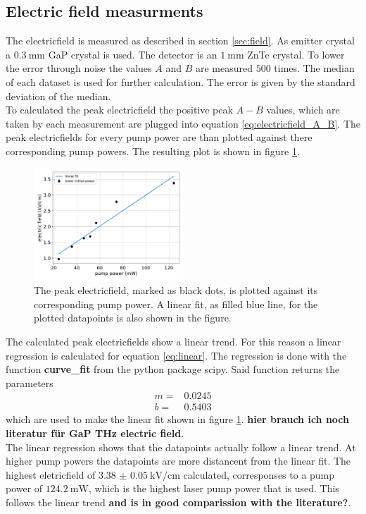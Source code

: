 \subsection{Electric field measurments}
\FloatBarrier
The electricfield is measured as described in section \ref{sec:field}.
As emitter crystal a $\SI{0.3}{\milli\meter}$ GaP crystal is used.
The detector is an $\SI{1}{\milli\meter}$ ZnTe crystal.
To lower the error through noise the values $A$ and $B$ are measured $500$ times.
The median of each dataset is used for further calculation.
The error is given by the standard deviation of the median.
\\
To calculated the peak electricfield the positive peak $A-B$ values, which are taken by each measurement are plugged into equation \ref{eq:electricfield_A_B}.
The peak electricfields for every pump power are than plotted against there corresponding pump powers.
The resulting plot is shown in figure \ref{fig:gap_electricfield}.
\begin{figure}
    \centering
    \includegraphics[width=0.5\textwidth]{Plots/eltric_field_GaP.pdf}
    \caption{The peak electricfield, marked as black dots, is plotted against its corresponding pump power.
    A linear fit, as filled blue line, for the plotted datapoints is also shown in the figure.}
    \label{fig:gap_electricfield}
\end{figure}
The calculated peak electricfields show a linear trend.
For this reason a linear regression is calculated for equation \ref{eq:linear}.
The regression is done with the function \textbf{curve\_fit} from the python package scipy.
Said function returns the parameters
\begin{align*} 
    m =& 0.0245\\
    b =& 0.5403
\end{align*}
which are used to make the linear fit shown in figure \ref{fig:gap_electricfield}.
\textbf{hier brauch ich noch literatur für GaP THz electric field}.
\\
The linear regression shows that the datapoints actually follow a linear trend.
At higher pump powers the datapoints are more distancent from the linear fit.
The highest eletricfield of $\SI{3.38(5)}{\kilo\V\per\centi\meter}$ calculated, corresponses to a pump power of $\SI{124.2}{\milli\W}$, which is the highest laser pump power that is used.
This follows the linear trend \textbf{and is in good comparission with the literature?}.

